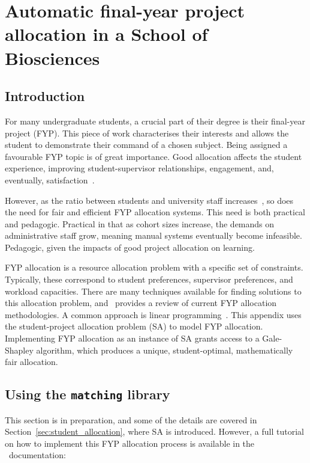 \chapter{Automatic final-year project allocation in a School of Biosciences}
\label{app:biosci}

\section{Introduction}

For many undergraduate students, a crucial part of their degree is their
final-year project (FYP). This piece of work characterises their interests and
allows the student to demonstrate their command of a chosen subject. Being
assigned a favourable FYP topic is of great importance. Good allocation affects
the student experience, improving student-supervisor relationships, engagement,
and, eventually, satisfaction~\cite{Briffa2018,Kuh2009}.

However, as the ratio between students and university staff
increases~\cite{McDonald2013}, so does the need for fair and efficient FYP
allocation systems. This need is both practical and pedagogic. Practical in that
as cohort sizes increase, the demands on administrative staff grow, meaning
manual systems eventually become infeasible. Pedagogic, given the impacts of
good project allocation on learning.

FYP allocation is a resource allocation problem with a specific set of
constraints. Typically, these correspond to student preferences, supervisor
preferences, and workload capacities. There are many techniques available for
finding solutions to this allocation problem, and~\cite{Hussain2019} provides a
review of current FYP allocation methodologies. A common approach is linear
programming~\cite{Chiarandini2017,Kwanashie2015}. This appendix uses the
student-project allocation problem (SA) to model FYP allocation. Implementing
FYP allocation as an instance of SA grants access to a Gale-Shapley algorithm,
which produces a unique, student-optimal, mathematically fair allocation.


\section{Using the {\color{grey}\texttt{matching}} library}
\label{sec:matching}

This section is in preparation, and some of the details are covered in
Section~\ref{sec:student_allocation}, where SA is introduced. However, a full
tutorial on how to implement this FYP allocation process is available in the
\matching\ documentation:

